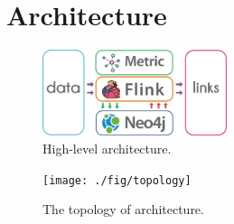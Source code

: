 \section{Architecture}
\label{sec:architecture}

\begin{figure}[]
	\centering
	\includegraphics[width=0.48\textwidth]{fig/crimegraph-layered-architecture.eps}
	\caption{High-level architecture.}
	\label{fig:layered-architecture}
\end{figure}

\lipsum[1]
\lipsum[1]

\begin{figure}
\centering
\texttt{[image: ./fig/topology]}
\caption{The topology of architecture.}
\label{fig:architecture}
\end{figure}

